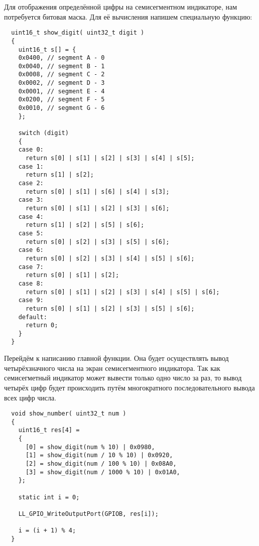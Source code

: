 Для отображения определённой цифры на семисегментном индикаторе, 
нам потребуется битовая маска. Для её вычисления 
напишем специальную функцию:
\begin{verbatim}
  uint16_t show_digit( uint32_t digit )
  {
    uint16_t s[] = {
    0x0400, // segment A - 0
    0x0040, // segment B - 1
    0x0008, // segment C - 2
    0x0002, // segment D - 3
    0x0001, // segment E - 4
    0x0200, // segment F - 5
    0x0010, // segment G - 6
    };
    
    switch (digit)
    {
    case 0:
      return s[0] | s[1] | s[2] | s[3] | s[4] | s[5];
    case 1:
      return s[1] | s[2];
    case 2:
      return s[0] | s[1] | s[6] | s[4] | s[3];
    case 3:
      return s[0] | s[1] | s[2] | s[3] | s[6];
    case 4:
      return s[1] | s[2] | s[5] | s[6];
    case 5:
      return s[0] | s[2] | s[3] | s[5] | s[6];
    case 6:
      return s[0] | s[2] | s[3] | s[4] | s[5] | s[6];
    case 7:
      return s[0] | s[1] | s[2];
    case 8:
      return s[0] | s[1] | s[2] | s[3] | s[4] | s[5] | s[6];
    case 9:
      return s[0] | s[1] | s[2] | s[3] | s[5] | s[6];
    default:
      return 0;
    }
  }
\end{verbatim}

Перейдём к написанию главной функции. Она будет осуществлять 
вывод четырёхзначного числа на экран семисегментного индикатора. 
Так как семисегметный индикатор может вывести только одно число за раз, 
то вывод четырёх цифр будет происходить путём 
многократного последовательного вывода всех цифр числа.
\begin{verbatim}  
  void show_number( uint32_t num )
  {
    uint16_t res[4] = 
    {
      [0] = show_digit(num % 10) | 0x0980,
      [1] = show_digit(num / 10 % 10) | 0x0920,
      [2] = show_digit(num / 100 % 10) | 0x08A0,
      [3] = show_digit(num / 1000 % 10) | 0x01A0,
    };
    
    static int i = 0;
    
    LL_GPIO_WriteOutputPort(GPIOB, res[i]);
    
    i = (i + 1) % 4;
  }
\end{verbatim}

